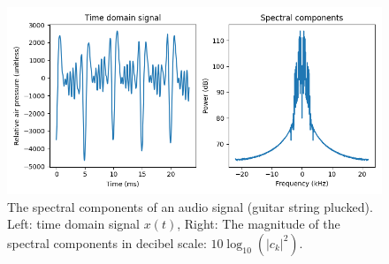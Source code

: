 \begin{figure}
  \begin{center}
    \includegraphics[width=\textwidth]{code/013_audio_spec/audio_spec.png}
  \end{center}
  \caption{The spectral components of an audio signal (guitar string plucked). Left: time domain signal $x(t)$, Right: The magnitude of the spectral components in decibel scale: $10\log_{10}(|c_k|^2)$.}
  \label{fig:audio_spec}
\end{figure}
